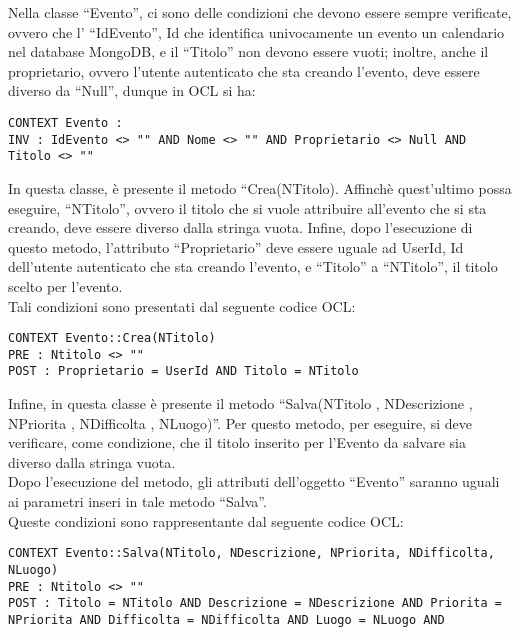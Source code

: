\begin{listaPersonale}[OCL]{}
    Nella classe “Evento”, ci sono delle condizioni che devono essere sempre verificate, ovvero che l’ “IdEvento”, Id che identifica univocamente un evento un calendario nel database MongoDB, e il “Titolo” non devono essere vuoti; inoltre, anche il proprietario, ovvero l’utente autenticato che sta creando l’evento, deve essere diverso da “Null”, dunque in OCL si ha:
    \begin{lstlisting}
CONTEXT Evento :
INV : IdEvento <> "" AND Nome <> "" AND Proprietario <> Null AND Titolo <> ""
    \end{lstlisting}
    In questa classe, è presente il metodo “Crea(NTitolo). Affinchè quest’ultimo possa eseguire, “NTitolo”, ovvero il titolo che si vuole attribuire all’evento che si sta creando, deve essere diverso dalla stringa vuota. Infine, dopo l’esecuzione di questo metodo, l’attributo “Proprietario” deve essere uguale ad UserId, Id dell’utente autenticato che sta creando l’evento, e “Titolo” a “NTitolo”, il titolo scelto per l’evento. \\
    Tali condizioni sono presentati dal seguente codice OCL:
    \begin{lstlisting}
CONTEXT Evento::Crea(NTitolo)
PRE : Ntitolo <> ""
POST : Proprietario = UserId AND Titolo = NTitolo
    \end{lstlisting}
    Infine, in questa classe è presente il metodo “Salva(NTitolo , NDescrizione , NPriorita , NDifficolta , NLuogo)”. Per questo metodo, per eseguire, si deve verificare, come condizione, che il titolo inserito per l’Evento da salvare sia diverso dalla stringa vuota. \\
    Dopo l’esecuzione del metodo, gli attributi dell’oggetto “Evento” saranno uguali ai parametri inseri in tale metodo “Salva”. \\
    Queste condizioni sono rappresentante dal seguente codice OCL:

    \begin{lstlisting}
CONTEXT Evento::Salva(NTitolo, NDescrizione, NPriorita, NDifficolta, NLuogo)
PRE : Ntitolo <> ""
POST : Titolo = NTitolo AND Descrizione = NDescrizione AND Priorita = NPriorita AND Difficolta = NDifficolta AND Luogo = NLuogo AND 
    \end{lstlisting}







\end{listaPersonale}
